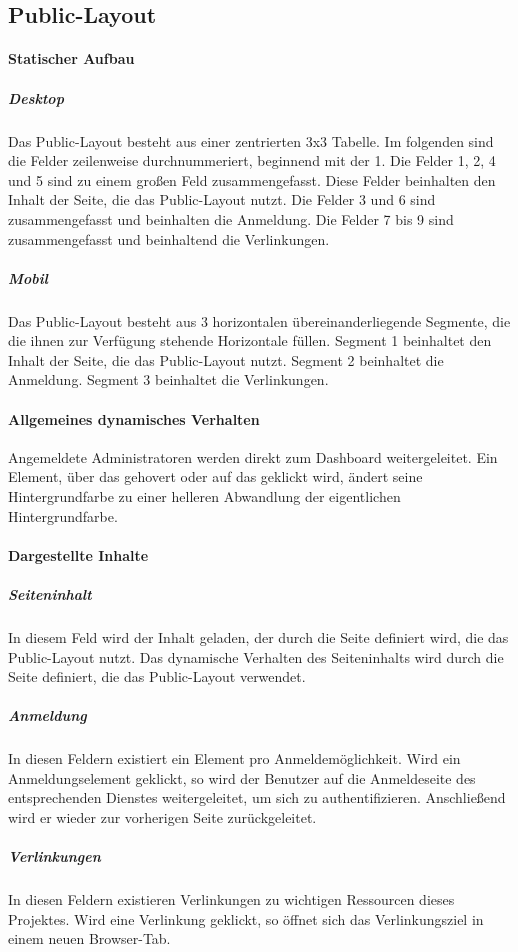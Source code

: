 \subsection{Public-Layout}

\paragraph*{Statischer Aufbau}
\subparagraph*{Desktop}
Das Public-Layout besteht aus einer zentrierten 3x3 Tabelle.
Im folgenden sind die Felder zeilenweise durchnummeriert, beginnend mit der 1.
Die Felder 1, 2, 4 und 5 sind zu einem großen Feld zusammengefasst. Diese Felder beinhalten den Inhalt der Seite, die das Public-Layout nutzt. 
Die Felder 3 und 6 sind zusammengefasst und beinhalten die Anmeldung.
Die Felder 7 bis 9 sind zusammengefasst und beinhaltend die Verlinkungen.

\subparagraph*{Mobil}
Das Public-Layout besteht aus 3 horizontalen übereinanderliegende Segmente, die die ihnen zur Verfügung stehende Horizontale füllen.
Segment 1 beinhaltet den Inhalt der Seite, die das Public-Layout nutzt. 
Segment 2 beinhaltet die Anmeldung.
Segment 3 beinhaltet die Verlinkungen.

\paragraph*{Allgemeines dynamisches Verhalten}
Angemeldete Administratoren werden direkt zum Dashboard weitergeleitet.
Ein Element, über das gehovert oder auf das geklickt wird, ändert seine Hintergrundfarbe zu einer helleren Abwandlung der eigentlichen Hintergrundfarbe.

\paragraph*{Dargestellte Inhalte}
\subparagraph*{Seiteninhalt}
In diesem Feld wird der Inhalt geladen, der durch die Seite definiert wird, die das Public-Layout nutzt.
Das dynamische Verhalten des Seiteninhalts wird durch die Seite definiert, die das Public-Layout verwendet.

\subparagraph*{Anmeldung}
In diesen Feldern existiert ein Element pro Anmeldemöglichkeit.
Wird ein Anmeldungselement geklickt, so wird der Benutzer auf die Anmeldeseite des entsprechenden Dienstes weitergeleitet, um sich zu authentifizieren.
Anschließend wird er wieder zur vorherigen Seite zurückgeleitet.

\subparagraph*{Verlinkungen}
In diesen Feldern existieren Verlinkungen zu wichtigen Ressourcen dieses Projektes.
Wird eine Verlinkung geklickt, so öffnet sich das Verlinkungsziel in einem neuen Browser-Tab.

